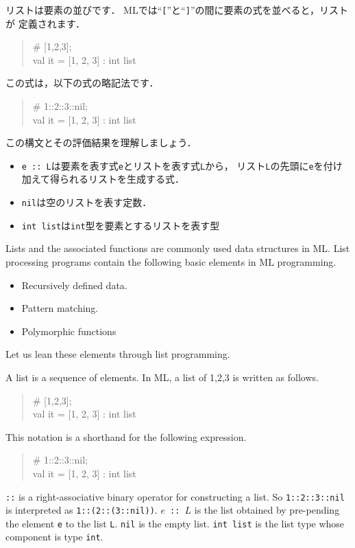 \documentclass{jbook}
\begin{document}
リストは要素の並びです．
	MLでは``{\tt [}''と``{\tt ]}''の間に要素の式を並べると，リストが
定義されます．
\begin{tt}
\begin{quote}
\# [1,2,3];\\
val it = [1, 2, 3] : int list
\end{quote}
\end{tt}
	この式は，以下の式の略記法です．
\begin{tt}
\begin{quote}
\# 1::2::3::nil;\\
val it = [1, 2, 3] : int list
\end{quote}
\end{tt}
	この構文とその評価結果を理解しましょう．
\begin{itemize}
\item 
 {\tt e :: L}は要素を表す式{\tt e}とリストを表す式{\tt L}から，
リスト{\tt L}の先頭に{\tt e}を付け加えて得られるリストを生成する式．
\item 
{\tt nil}は空のリストを表す定数．
\item 
{\tt int list}は{\tt int}型を要素とするリストを表す型
\end{itemize}
\else%
	Lists and the associated functions are commonly used data
structures in ML.
	List processing programs contain the following basic elements in
ML programming.
\begin{itemize}
\item 
	Recursively defined data.
\item 
	Pattern matching.
\item 
	Polymorphic functions
\end{itemize}
	Let us lean these elements through list programming.

	A list is a sequence of elements.
	In ML, a list of 1,2,3 is written as follows.
\begin{tt}
\begin{quote}
\# [1,2,3];\\
val it = [1, 2, 3] : int list
\end{quote}
\end{tt}
	This notation is a shorthand for the following expression.
\begin{tt}
\begin{quote}
\# 1::2::3::nil;\\
val it = [1, 2, 3] : int list
\end{quote}
\end{tt}
	{\tt ::} is a right-associative binary operator for constructing
a list.
	So {\tt 1::2::3::nil} is interpreted as {\tt 1::(2::(3::nil))}.
	 {\tt $e$ :: $L$} is the list obtained by pre-pending the element {\tt e} to
the list {\tt L}.
	{\tt nil} is the empty list.
	{\tt int list} is the list type whose component is type {\tt int}.
\fi%
\end{document}
